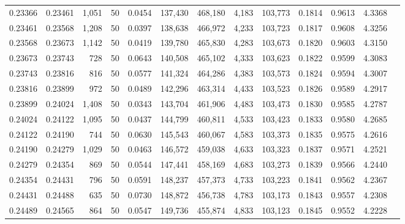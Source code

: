 \begin{tabular}{rrrrrrrrrrrrr}
0.23366 & 0.23461 & 1,051 &  50 &                                     0.0454 & 137,430 & 468,180 &   4,183 & 103,773 & 0.1814 & 0.9613 & 4.3368 \\
0.23461 & 0.23568 & 1,208 &  50 &                                     0.0397 & 138,638 & 466,972 &   4,233 & 103,723 & 0.1817 & 0.9608 & 4.3256 \\
0.23568 & 0.23673 & 1,142 &  50 &                                     0.0419 & 139,780 & 465,830 &   4,283 & 103,673 & 0.1820 & 0.9603 & 4.3150 \\
0.23673 & 0.23743 &   728 &  50 &                                     0.0643 & 140,508 & 465,102 &   4,333 & 103,623 & 0.1822 & 0.9599 & 4.3083 \\
0.23743 & 0.23816 &   816 &  50 &                                     0.0577 & 141,324 & 464,286 &   4,383 & 103,573 & 0.1824 & 0.9594 & 4.3007 \\
0.23816 & 0.23899 &   972 &  50 &                                     0.0489 & 142,296 & 463,314 &   4,433 & 103,523 & 0.1826 & 0.9589 & 4.2917 \\
0.23899 & 0.24024 & 1,408 &  50 &                                     0.0343 & 143,704 & 461,906 &   4,483 & 103,473 & 0.1830 & 0.9585 & 4.2787 \\
0.24024 & 0.24122 & 1,095 &  50 &                                     0.0437 & 144,799 & 460,811 &   4,533 & 103,423 & 0.1833 & 0.9580 & 4.2685 \\
0.24122 & 0.24190 &   744 &  50 &                                     0.0630 & 145,543 & 460,067 &   4,583 & 103,373 & 0.1835 & 0.9575 & 4.2616 \\
0.24190 & 0.24279 & 1,029 &  50 &                                     0.0463 & 146,572 & 459,038 &   4,633 & 103,323 & 0.1837 & 0.9571 & 4.2521 \\
0.24279 & 0.24354 &   869 &  50 &                                     0.0544 & 147,441 & 458,169 &   4,683 & 103,273 & 0.1839 & 0.9566 & 4.2440 \\
0.24354 & 0.24431 &   796 &  50 &                                     0.0591 & 148,237 & 457,373 &   4,733 & 103,223 & 0.1841 & 0.9562 & 4.2367 \\
0.24431 & 0.24488 &   635 &  50 &                                     0.0730 & 148,872 & 456,738 &   4,783 & 103,173 & 0.1843 & 0.9557 & 4.2308 \\
0.24489 & 0.24565 &   864 &  50 &                                     0.0547 & 149,736 & 455,874 &   4,833 & 103,123 & 0.1845 & 0.9552 & 4.2228 \\

\end{tabular}
